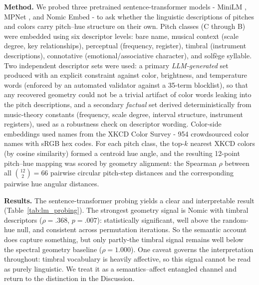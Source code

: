 \documentclass[12pt]{article}
\begin{document}
\textbf{Method.} We probed three pretrained sentence-transformer
models - MiniLM \citep{wang2020}, MPNet \citep{song2020}, and Nomic
Embed \citep{nussbaum2024} - to ask whether the linguistic descriptions of
pitches and colors carry pitch--hue structure on their own. Pitch
classes (C through B) were embedded using six descriptor levels: bare
name, musical context (scale degree, key relationships), perceptual
(frequency, register), timbral (instrument descriptions), connotative
(emotional/associative character), and solf\`{e}ge syllable. Two
independent descriptor sets were used: a primary \emph{LLM-generated}
set produced with an explicit constraint against
color, brightness, and temperature words (enforced by an automated
validator against a 35-term blocklist), so that any recovered geometry
could not be a trivial artifact of color words leaking into the pitch
descriptions, and a secondary \emph{factual} set derived
deterministically from music-theory constants (frequency, scale
degree, interval structure, instrument registers), used as a
robustness check on descriptor wording. Color-side embeddings used names from the XKCD Color
Survey \citep{munroe2010xkcd} - 954 crowdsourced color names with sRGB
hex codes. For each pitch class, the top-$k$ nearest XKCD colors (by
cosine similarity) formed a centroid hue angle, and the resulting
12-point pitch--hue mapping was scored by geometry alignment: the
Spearman $\rho$ between all $\binom{12}{2} = 66$ pairwise circular
pitch-step distances and the corresponding pairwise hue angular
distances.

\textbf{Results.} The sentence-transformer probing yields a clear and interpretable
result (Table~\ref{tab:lm_probing}). The strongest geometry signal is
Nomic with timbral descriptors ($\rho = .368$, $p = .007$):
statistically significant, well above the random-hue null, and
consistent across permutation iterations. So the semantic account does
capture something, but only partly-the timbral signal remains well
below the spectral geometry baseline ($\rho = 1.000$). One caveat
governs the interpretation throughout: timbral vocabulary is heavily
affective, so this signal cannot be read as purely linguistic. We treat
it as a semantics--affect entangled channel and return to the
distinction in the Discussion.
\end{document}
